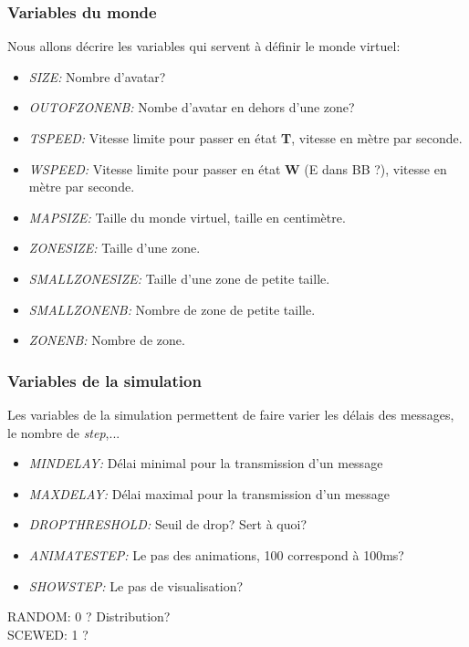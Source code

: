 \documentclass[11pt,a4paper]{article}
\begin{document}
\subsubsection{Variables du monde}
Nous allons décrire les variables qui servent à définir le monde virtuel:
\begin{itemize}
	\renewcommand{\labelitemi}{$\bullet$}
	\item \textit{SIZE:} Nombre d'avatar? 
	\item \textit{OUTOFZONENB:} Nombe d'avatar en dehors d'une zone?
	\item \textit{TSPEED:} Vitesse limite pour passer en état \textbf{T}, vitesse en mètre par seconde.
	\item \textit{WSPEED:} Vitesse limite pour passer en état \textbf{W} (E dans BB ?), vitesse en mètre par seconde.
	\item \textit{MAPSIZE:} Taille du monde virtuel, taille en centimètre.
	\item \textit{ZONESIZE:} Taille d'une zone.
	\item \textit{SMALLZONESIZE:} Taille d'une zone de petite taille.
	\item \textit{SMALLZONENB:} Nombre de zone de petite taille.
	\item \textit{ZONENB:} Nombre de zone.
\end{itemize}

\subsubsection{Variables de la simulation}
Les variables de la simulation permettent de faire varier les délais des messages, le nombre de \textit{step},...
\begin{itemize}
	\renewcommand{\labelitemi}{$\bullet$} 
	\item \textit{MINDELAY:} Délai minimal pour la transmission d'un message
	\item \textit{MAXDELAY:} Délai maximal pour la transmission d'un message
	\item \textit{DROPTHRESHOLD:} Seuil de drop? Sert à quoi?
	\item \textit{ANIMATESTEP:} Le pas des animations, 100 correspond à 100ms? 
	\item \textit{SHOWSTEP:} Le pas de visualisation?
\end{itemize}
RANDOM: 0 ? Distribution?\\
SCEWED: 1 ?\\
\end{document}
